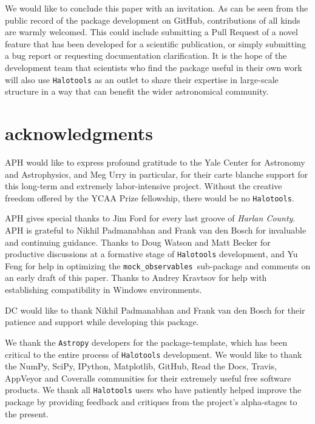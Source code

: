 \documentclass[twocolumn, tighten]{aastex6}
\newcommand{\mockobs}{{\tt mock\_observables }}
\begin{document}
We would like to conclude this paper with an invitation. As can be seen from the public record of the package development on GitHub, contributions of all kinds are warmly welcomed. This could include submitting a Pull Request of a novel feature that has been developed for a scientific publication, or simply submitting a bug report or requesting documentation clarification. It is the hope of the development team that scientists who find the package useful in their own work will also use {\tt Halotools} as an outlet to share their expertise in large-scale structure in a way that can benefit the wider astronomical community.


\section{acknowledgments}

APH would like to express profound gratitude to the Yale Center for Astronomy and Astrophysics, and Meg Urry in particular, for their carte blanche support for this long-term and extremely labor-intensive project. Without the creative freedom offered by the YCAA Prize fellowship, there would be no {\tt Halotools}.

APH gives special thanks to Jim Ford for every last groove of {\em Harlan County}. APH is grateful to Nikhil Padmanabhan and Frank van den Bosch for invaluable and continuing guidance. Thanks to Doug Watson and Matt Becker for productive discussions at a formative stage of {\tt Halotools} development, and Yu Feng for help in optimizing the \mockobs sub-package and comments on an early draft of this paper. Thanks to Andrey Kravtsov for help with establishing compatibility in Windows environments.

DC would like to thank Nikhil Padmanabhan and Frank van den Bosch for their patience and support while developing this package.

We thank the {\tt Astropy} developers for the package-template, which has been critical to the entire process of {\tt Halotools} development.
We would like to thank the NumPy, SciPy, IPython, Matplotlib, GitHub, Read the Docs, Travis, AppVeyor and Coveralls communities for their extremely useful free software products. We thank all {\tt Halotools} users who have patiently helped improve the package by providing feedback and critiques from the project's alpha-stages to the present.
\end{document}
